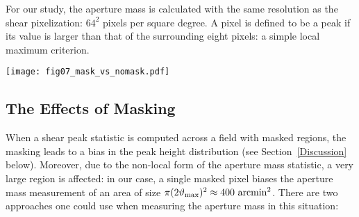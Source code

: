 For our study, the aperture mass is calculated with the same resolution as the
shear pixelization: $64^2$ pixels per square degree.  A pixel is defined to be
a peak if its value is larger than that of the surrounding eight pixels:
a simple local maximum criterion. 

\begin{figure*}
 \centering
 \texttt{[image: fig07\_mask\_vs\_nomask.pdf]}
 \caption[Comparison of the masked and unmasked peak distributions.]{
   Comparison of the masked and unmasked peak distributions.
   \textit{left panel:} the peak distributions without the use of KL.
   The black line is the result with no masking, while the red and green
   lines show the two \naive methods of correcting for the mask (see
   Section~\ref{MaskingEffects}).
   \textit{right panel:}  the masked and unmasked peak distributions
   after applying KL. 
   Neither \naive method of mask-correction adequately recovers 
   the underlying peak distribution.  It is evident, however, that 
   the KL-based interpolation procedure recovers a mass map with 
   a similar peak distribution to the unmasked KL map.
   It should be noted that the unmasked peak distribution 
   (black line, left panel) is not identical to the unmasked peak distribution
   after application of KL (black line, right panel).  This difference is
   addressed in Figure~\ref{fig_num_peaks}.
   \label{fig_mask_nomask} 
 }
\end{figure*} 

\subsection{The Effects of Masking}
\label{MaskingEffects}
When a shear peak statistic is computed across a field with masked regions,
the masking leads to a bias in the peak height distribution
(see Section~\ref{Discussion} below).  Moreover, due
to the non-local form of the aperture mass statistic, a very large region is
affected: in our case, a single masked pixel biases the aperture mass 
measurement of an area of size
 $\pi(2\vartheta_{\rm max})^2 \approx 400\ {\rm arcmin}^2$.  
There are two \naive approaches one could use when measuring the 
aperture mass in this situation:

